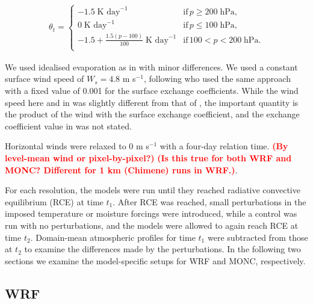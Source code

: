 \documentclass[draft]{agujournal2019}
\newcommand{\todo}[1]{\textcolor{red}{\textbf{(#1)}}}
\begin{document}
\begin{align}
 \theta_t = \begin{cases}
    -1.5\; \textrm{K day}^{-1} & \textrm{if}\, p \geq 200\; \textrm{hPa}, \\
    0\; \textrm{K day}^{-1} & \textrm{if}\, p \leq 100\; \textrm{hPa}, \\
    -1.5 + \frac{1.5 (p-100)}{100}\; \textrm{K day}^{-1} & \textrm{if}\, 100 < p < 200\; \textrm{hPa}. \\
 \end{cases}
\end{align}

We used idealised evaporation as in  with minor
differences. We used a constant surface wind speed of $W_s = 4.8$ m s$^{-1}$,
following  who used the same approach with a fixed value
of 0.001 for the surface exchange coefficients. While the wind speed here and in
 was slightly different from that of
, the important quantity is the product of the wind with
the surface exchange coefficient, and the exchange coefficient value in
 was not stated.

Horizontal winds were relaxed to 0 m s$^{-1}$ with a four-day relation time.
\todo{By level-mean wind or pixel-by-pixel?} \todo{Is this true for both WRF and
MONC? Different for 1 km (Chimene) runs in WRF.}.

For each resolution, the models were run until they reached radiative convective
equilibrium (RCE) at time $t_1$. After RCE was reached, small perturbations in the imposed
temperature or moisture forcings were introduced, while a control was run with no
perturbations, and the models were allowed to again reach RCE at time $t_2$.
Domain-mean atmospheric profiles for time $t_1$ were subtracted from those at
$t_2$ to examine the differences made by the perturbations. In the following two
sections we examine the model-specific setups for WRF and MONC, respectively.

\subsection{WRF}
\end{document}

